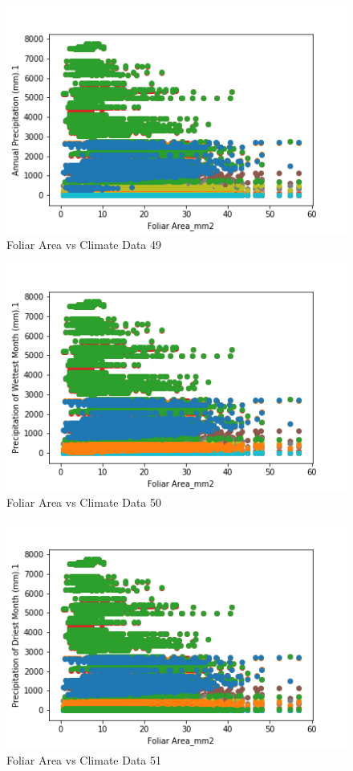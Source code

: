 \documentclass[letterpaper]{article}
\begin{document}
\begin{figure}[h]
\caption{Foliar Area vs Climate Data 49\label{fig:Foliar_Area_vs_49}}
\centering
\includegraphics[width=0.7\paperwidth]{Foliar_Area_vs_49}
\end{figure}


\begin{figure}[h]
\caption{Foliar Area vs Climate Data 50\label{fig:Foliar_Area_vs_50}}
\centering
\includegraphics[width=0.7\paperwidth]{Foliar_Area_vs_50}
\end{figure}


\begin{figure}[h]
\caption{Foliar Area vs Climate Data 51\label{fig:Foliar_Area_vs_51}}
\centering
\includegraphics[width=0.7\paperwidth]{Foliar_Area_vs_51}
\end{figure}
\end{document}
